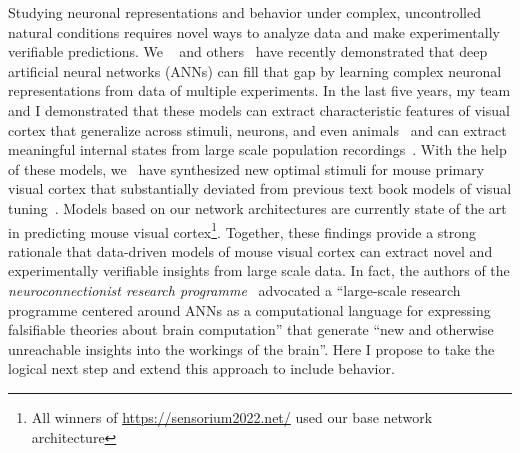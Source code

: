 \documentclass[COG,11pt]{ercgrant}
\begin{document}
Studying neuronal representations and behavior under complex, uncontrolled natural conditions requires novel ways to analyze data and make experimentally verifiable predictions. 
We ~\parencite{Walker2019-yw, Cobos2022-rr, Franke2022-do} and others~\parencite{Bashivan2019-ry, Ponce2019-yn, Hofling2022-wr} have recently demonstrated that deep artificial neural networks (ANNs) can fill that gap by learning complex neuronal representations from data of multiple experiments.
In the last five years, my team and I demonstrated that these models can extract characteristic features of visual cortex that generalize across stimuli, neurons, and even animals~\parencite{Sinz2018-sk,Lurz2020-ua,Cobos2022-rr} and can extract meaningful internal states from large scale population recordings~\parencite{Bashiri2021-or}. 
With the help of these models, we~\parencite{Walker2019-yw} have synthesized new optimal stimuli for mouse primary visual cortex that substantially deviated from previous text book models of visual tuning~\parencite{Hubel1959-zs}.
Models based on our network architectures are currently state of the art in predicting mouse visual cortex\footnote{All winners of  \url{https://sensorium2022.net/} used our base network architecture}. 
Together, these findings provide a strong rationale that data-driven models of mouse visual cortex can extract novel and experimentally verifiable insights from large scale data. 
In fact, the authors of the \textit{neuroconnectionist research programme}~\parencite{Doerig2022-ex} advocated a ``large-scale research programme centered around ANNs as a computational language for expressing falsifiable theories about brain computation'' that generate ``new and otherwise unreachable insights into the workings of the brain''. 
Here I propose to take the logical next step and extend this approach to include behavior. 

\end{document}
